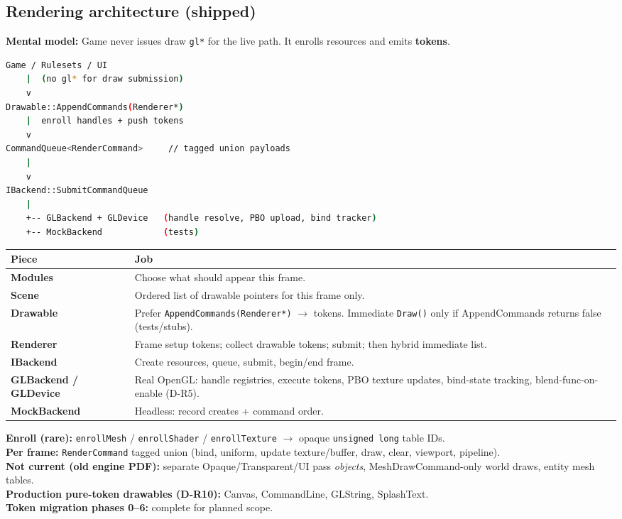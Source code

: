 \documentclass[10pt,a4paper]{article}
\begin{document}
\subsection{Rendering architecture (shipped)}
\textbf{Mental model:} Game never issues draw \texttt{gl*} for the live path. It enrolls resources and emits \textbf{tokens}.

\begin{lstlisting}[language=bash]
Game / Rulesets / UI
    |  (no gl* for draw submission)
    v
Drawable::AppendCommands(Renderer*)
    |  enroll handles + push tokens
    v
CommandQueue<RenderCommand>     // tagged union payloads
    |
    v
IBackend::SubmitCommandQueue
    |
    +-- GLBackend + GLDevice   (handle resolve, PBO upload, bind tracker)
    +-- MockBackend            (tests)
\end{lstlisting}

\begin{table}[h!]
\centering
\small
\begin{tabularx}{\textwidth}{l X}
\toprule
\textbf{Piece} & \textbf{Job} \\
\midrule
\textbf{Modules} & Choose what should appear this frame. \\
\textbf{Scene} & Ordered list of drawable pointers for this frame only. \\
\textbf{Drawable} & Prefer \texttt{AppendCommands(Renderer*)} $\rightarrow$ tokens. Immediate \texttt{Draw()} only if AppendCommands returns false (tests/stubs). \\
\textbf{Renderer} & Frame setup tokens; collect drawable tokens; submit; then hybrid immediate list. \\
\textbf{IBackend} & Create resources, queue, submit, begin/end frame. \\
\textbf{GLBackend / GLDevice} & Real OpenGL: handle registries, execute tokens, PBO texture updates, bind-state tracking, blend-func-on-enable (D-R5). \\
\textbf{MockBackend} & Headless: record creates + command order. \\
\bottomrule
\end{tabularx}
\end{table}

\noindent \textbf{Enroll (rare):} \texttt{enrollMesh} / \texttt{enrollShader} / \texttt{enrollTexture} $\rightarrow$ opaque \texttt{unsigned long} table IDs.\\
\textbf{Per frame:} \texttt{RenderCommand} tagged union (bind, uniform, update texture/buffer, draw, clear, viewport, pipeline).\\
\textbf{Not current (old engine PDF):} separate Opaque/Transparent/UI pass \textit{objects}, MeshDrawCommand-only world draws, entity mesh tables.\\
\textbf{Production pure-token drawables (D-R10):} Canvas, CommandLine, GLString, SplashText.\\
\textbf{Token migration phases 0--6:} complete for planned scope.
\end{document}
